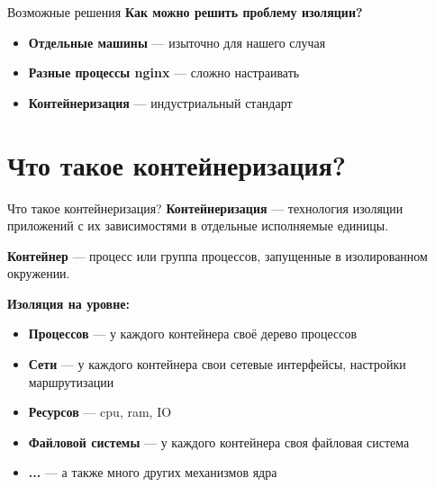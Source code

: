 \documentclass[aspectratio=169]{beamer}
\begin{document}
\begin{frame}{Возможные решения}
\textbf{Как можно решить проблему изоляции?}

\begin{itemize}
\item \textbf{Отдельные машины} — изыточно для нашего случая
\item \textbf{Разные процессы nginx} — сложно настраивать
\item \textbf{Контейнеризация} — индустриальный стандарт
\end{itemize}
\end{frame}

\section{Что такое контейнеризация?}

\begin{frame}{Что такое контейнеризация?}
\textbf{Контейнеризация} — технология изоляции приложений с их зависимостями в отдельные исполняемые единицы.

\textbf{Контейнер} — процесс или группа процессов, запущенные в изолированном окружении.

\vspace{0.2cm}

\textbf{Изоляция на уровне:}
\begin{itemize}
\item \textbf{Процессов} — у каждого контейнера своё дерево процессов
\item \textbf{Сети} — у каждого контейнера свои сетевые интерфейсы, настройки маршрутизации
\item \textbf{Ресурсов } — cpu, ram, IO
\item \textbf{Файловой системы } — у каждого контейнера своя файловая система
\item \textbf{...} — а также много других механизмов ядра
\end{itemize}
\end{frame}
\end{document}
